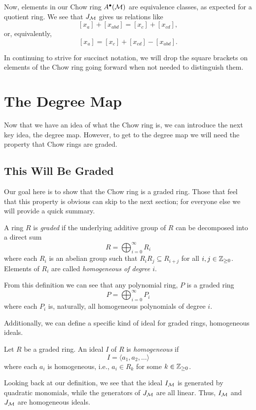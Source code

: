 \documentclass[12pt,oneside]{../../sfsuthesis}
\begin{document}
Now, elements in our Chow ring \( A^\bullet(\mathcal{M}) \) are equivalence classes, as expected for a quotient ring.
We see that \( J_{\mathcal{M}} \) gives us relations like
\[
    [x_a] + [x_{abd}] = [x_c] + [x_{cd}],
\]
or, equivalently,
\[
    [x_a] = [x_c] + [x_{cd}] - [x_{abd}].
\]

In continuing to strive for succinct notation, we will drop the square brackets on elements of the Chow ring going forward when not needed to distinguish them.

\section{The Degree Map}

Now that we have an idea of what the Chow ring is, we can introduce the next key idea, the degree map.
However, to get to the degree map we will need the property that Chow rings are graded.

\subsection{This Will Be Graded}
Our goal here is to show that the Chow ring is a graded ring.
Those that feel that this property is obvious can skip to the next section; for everyone else we will provide a quick summary.
\begin{definition}
    A ring \( R \) is \emph{graded} if the underlying additive group of \( R \) can be decomposed into a direct sum
    \[
        R = \bigoplus_{i=0}^\infty R_i
    \]
    where each \( R_i \) is an abelian group such that \( R_i R_j \subseteq R_{i+j} \) for all \( i, j \in \mathbb{Z}_{\geq 0}\).
    Elements of \( R_i \) are called \emph{homogeneous of degree \( i \)}.
\end{definition}
From this definition we can see that any polynomial ring, \( P \) is a graded ring
\[
    P =  \bigoplus_{i=0}^\infty P_i
\]
where each \( P_i \) is, naturally, all homogeneous polynomials of degree \( i \).

Additionally, we can define a specific kind of ideal for graded rings, homogeneous ideals.
\begin{definition}
    Let \( R \) be a graded ring. An ideal \( I \) of \( R \) is \emph{homogeneous} if
    \[
        I = \langle a_1, a_2, \dots \rangle
    \]
    where each \( a_i \) is homogeneous, i.e., \( a_i \in R_k \) for some \( k \in \mathbb{Z}_{\geq 0} \).
\end{definition}
Looking back at our definition, we see that the ideal \( I_{\mathcal{M}} \) is generated by quadratic monomials, while the generators of \( J_{\mathcal{M}} \) are all linear.
Thus, \( I_{\mathcal{M}} \) and \( J_{\mathcal{M}} \) are homogeneous ideals.
\end{document}
